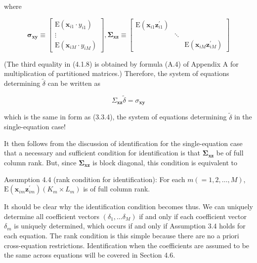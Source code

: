\documentclass[10pt]{article}
\begin{document}
where

\[
\boldsymbol{\sigma}_{\mathbf{x y}} \equiv\left[\begin{array}{c}
\mathrm{E}\left(\mathbf{x}_{i 1} \cdot y_{i 1}\right)  \tag{4.1.9}\\
\vdots \\
\mathrm{E}\left(\mathbf{x}_{i M} \cdot y_{i M}\right)
\end{array}\right], \boldsymbol{\Sigma}_{\mathbf{x z}} \equiv\left[\begin{array}{ccc}
\mathrm{E}\left(\mathbf{x}_{i 1} \mathbf{z}_{i 1}^{\prime}\right) & & \\
& \ddots & \\
& & \mathrm{E}\left(\mathbf{x}_{i M} \mathbf{z}_{i M}^{\prime}\right)
\end{array}\right]
\]

(The third equality in (4.1.8) is obtained by formula (A.4) of Appendix A for multiplication of partitioned matrices.) Therefore, the system of equations determining $\tilde{\delta}$ can be written as


\begin{equation*}
\Sigma_{\mathbf{x z}} \tilde{\delta}=\sigma_{\mathbf{x y}} \tag{4.1.10}
\end{equation*}


which is the same in form as (3.3.4), the system of equations determining $\tilde{\delta}$ in the single-equation case!

It then follows from the discussion of identification for the single-equation case that a necessary and sufficient condition for identification is that $\boldsymbol{\Sigma}_{\mathbf{x z}}$ be of full column rank. But, since $\boldsymbol{\Sigma}_{\mathbf{x z}}$ is block diagonal, this condition is equivalent to

Assumption 4.4 (rank condition for identification): For each $m(=1,2, \ldots, M)$, $\mathrm{E}\left(\mathbf{x}_{i m} \mathbf{z}_{i m}^{\prime}\right)\left(K_{m} \times L_{m}\right)$ is of full column rank.

It should be clear why the identification condition becomes thus. We can uniquely determine all coefficient vectors $\left(\delta_{1}, \ldots \delta_{M}\right)$ if and only if each coefficient vector $\delta_{m}$ is uniquely determined, which occurs if and only if Assumption 3.4 holds for each equation. The rank condition is this simple because there are no a priori cross-equation restrictions. Identification when the coefficients are assumed to be the same across equations will be covered in Section 4.6.
\end{document}
